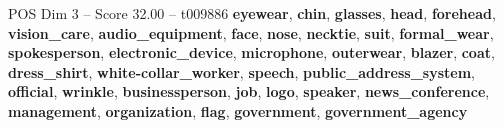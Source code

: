 \begin{textsample}{POS Dim 3 – Score 32.00 – t009886}  \label{ex:f3_pos_006}
\textbf{eyewear}, \textbf{chin}, \textbf{glasses}, \textbf{head}, \textbf{forehead}, \textbf{vision\_care}, \textbf{audio\_equipment}, \textbf{face}, \textbf{nose}, \textbf{necktie}, \textbf{suit}, \textbf{formal\_wear}, \textbf{spokesperson}, \textbf{electronic\_device}, \textbf{microphone}, \textbf{outerwear}, \textbf{blazer}, \textbf{coat}, \textbf{dress\_shirt}, \textbf{white-collar\_worker}, \textbf{speech}, \textbf{public\_address\_system}, \textbf{official}, \textbf{wrinkle}, \textbf{businessperson}, \textbf{job}, \textbf{logo}, \textbf{speaker}, \textbf{news\_conference}, \textbf{management}, \textbf{organization}, \textbf{flag}, \textbf{government}, \textbf{government\_agency}

\end{textsample}

